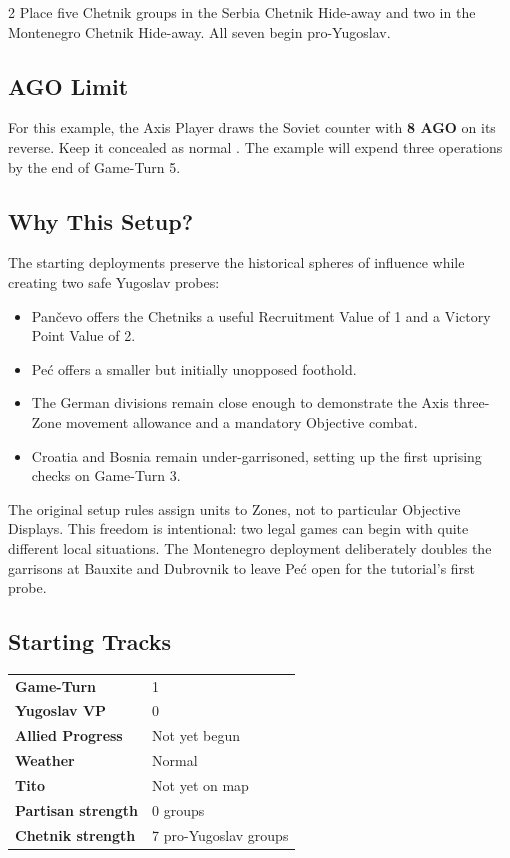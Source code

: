 \begin{multicols}{2}
Place five Chetnik groups in the Serbia Chetnik Hide-away and two in the
Montenegro Chetnik Hide-away. All seven begin pro-Yugoslav.

\subsection{AGO Limit}

For this example, the Axis Player draws the Soviet counter with
\textbf{8 AGO} on its reverse. Keep it concealed as normal
. The example will expend three operations by the end
of Game-Turn 5.

\columnbreak

\subsection{Why This Setup?}

The starting deployments preserve the historical spheres of influence while
creating two safe Yugoslav probes:

\begin{itemize}[leftmargin=1.2em,itemsep=2pt]
  \item Pančevo offers the Chetniks a useful Recruitment Value of 1 and a
    Victory Point Value of 2.
  \item Peć offers a smaller but initially unopposed foothold.
  \item The German divisions remain close enough to demonstrate the Axis
    three-Zone movement allowance and a mandatory Objective combat.
  \item Croatia and Bosnia remain under-garrisoned, setting up the first
    uprising checks on Game-Turn 3.
\end{itemize}

\begin{commentarybox}
The original setup rules assign units to Zones, not to particular Objective
Displays. This freedom is intentional: two legal games can begin with quite
different local situations. The Montenegro deployment deliberately doubles
the garrisons at Bauxite and Dubrovnik to leave Peć open for the tutorial's
first probe.
\end{commentarybox}

\subsection{Starting Tracks}

\begin{tabularx}{\linewidth}{@{}>{\bfseries}l X@{}}
  Game-Turn & 1 \\
  Yugoslav VP & 0 \\
  Allied Progress & Not yet begun \\
  Weather & Normal \\
  Tito & Not yet on map \\
  Partisan strength & 0 groups \\
  Chetnik strength & 7 pro-Yugoslav groups \\
\end{tabularx}
\end{multicols}

